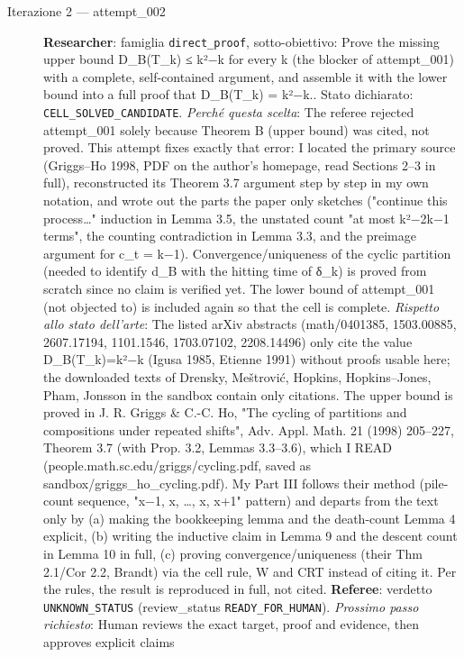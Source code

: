 \documentclass[11pt,a4paper]{article}
\begin{document}
\begin{description}
\item[Iterazione 2 — attempt\_002]
\textbf{Researcher}: famiglia \texttt{direct\_proof}, sotto-obiettivo: Prove the missing upper bound D\_B(T\_k) ≤ k²−k for every k (the blocker of attempt\_001) with a complete, self-contained argument, and assemble it with the lower bound into a full proof that D\_B(T\_k) = k²−k.. Stato dichiarato: \texttt{CELL\_SOLVED\_CANDIDATE}.
\emph{Perché questa scelta}: The referee rejected attempt\_001 solely because Theorem B (upper bound) was cited, not proved. This attempt fixes exactly that error: I located the primary source (Griggs–Ho 1998, PDF on the author's homepage, read Sections 2–3 in full), reconstructed its Theorem 3.7 argument step by step in my own notation, and wrote out the parts the paper only sketches ("continue this process…" induction in Lemma 3.5, the unstated count "at most k²−2k−1 terms", the counting contradiction in Lemma 3.3, and the preimage argument for c\_t = k−1). Convergence/uniqueness of the cyclic partition (needed to identify d\_B with the hitting time of δ\_k) is proved from scratch since no claim is verified yet. The lower bound of attempt\_001 (not objected to) is included again so that the cell is complete.
\emph{Rispetto allo stato dell'arte}: The listed arXiv abstracts (math/0401385, 1503.00885, 2607.17194, 1101.1546, 1703.07102, 2208.14496) only cite the value D\_B(T\_k)=k²−k (Igusa 1985, Etienne 1991) without proofs usable here; the downloaded texts of Drensky, Meštrović, Hopkins, Hopkins–Jones, Pham, Jonsson in the sandbox contain only citations. The upper bound is proved in J. R. Griggs \& C.-C. Ho, "The cycling of partitions and compositions under repeated shifts", Adv. Appl. Math. 21 (1998) 205–227, Theorem 3.7 (with Prop. 3.2, Lemmas 3.3–3.6), which I READ (people.math.sc.edu/griggs/cycling.pdf, saved as sandbox/griggs\_ho\_cycling.pdf). My Part III follows their method (pile-count sequence, "x−1, x, …, x, x+1" pattern) and departs from the text only by (a) making the bookkeeping lemma and the death-count Lemma 4 explicit, (b) writing the inductive claim in Lemma 9 and the descent count in Lemma 10 in full, (c) proving convergence/uniqueness (their Thm 2.1/Cor 2.2, Brandt) via the cell rule, W and CRT instead of citing it. Per the rules, the result is reproduced in full, not cited.
\textbf{Referee}: verdetto \texttt{UNKNOWN\_STATUS} (review\_status \texttt{READY\_FOR\_HUMAN}).
\emph{Prossimo passo richiesto}: Human reviews the exact target, proof and evidence, then approves explicit claims
\end{description}
\end{document}

